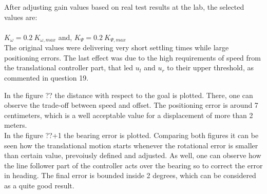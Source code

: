 \documentclass[11pt]{article}
\begin{document}
After adjusting gain values based on real test results at the lab, the selected values are:\\\\
$K_{\omega} =0.2\:K_{\omega,max}$  and, $ K_{\Psi} = 0.2\:K_{\Psi,max} $ \\

The original values were delivering very short settling times while large
positioning errors. The last effect was due to the high requirements of speed
from the translational controller part, that led $u_{l}$ and $u_{r}$ to their
upper threshold, as commented in question 19.

In the figure ?? the distance with respect to the goal is plotted. There, one
can observe the trade-off  between speed and offset. The positioning error is
around 7 centimeters, which is a well acceptable value for a displacement of
more than 2 meters. \\


In the figure ??+1 the bearing error is plotted. Comparing both figures it can
be seen how the translational motion starts whenever the rotational error is
smaller than certain value, prevoiusly defined and adjusted. As well, one can
observe how the line follower part of the controller acts over the bearing so
to correct the error in heading. The final error is bounded inside 2 degrees,
which can be considered as a quite good result.

\end{document}
